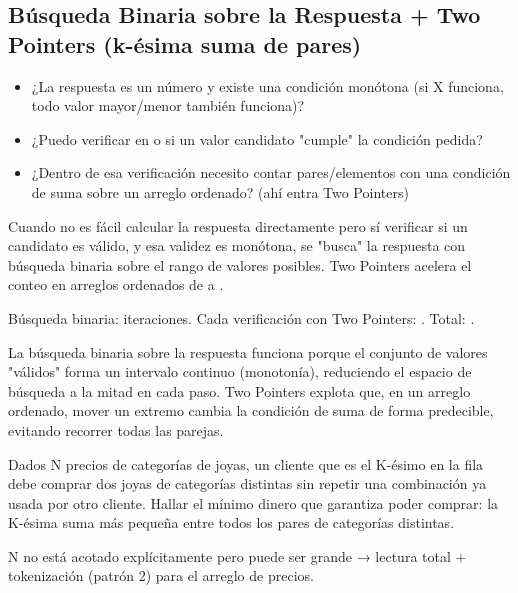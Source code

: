 \subsection{Búsqueda Binaria sobre la Respuesta + Two Pointers (k-ésima suma de pares)}
\label{alg:5-1}


\begin{itemize}
\item ¿La respuesta es un número y existe una condición monótona (si X funciona, todo valor mayor/menor también funciona)?
\item ¿Puedo verificar en  o  si un valor candidato "cumple" la condición pedida?
\item ¿Dentro de esa verificación necesito contar pares/elementos con una condición de suma sobre un arreglo ordenado? (ahí entra Two Pointers)
\end{itemize}

 Cuando no es fácil calcular la respuesta directamente pero sí verificar si un candidato es válido, y esa validez es monótona, se "busca" la respuesta con búsqueda binaria sobre el rango de valores posibles. Two Pointers acelera el conteo en arreglos ordenados de  a .

 Búsqueda binaria:  iteraciones. Cada verificación con Two Pointers: . Total: .

 La búsqueda binaria sobre la respuesta funciona porque el conjunto de valores "válidos" forma un intervalo continuo (monotonía), reduciendo el espacio de búsqueda a la mitad en cada paso. Two Pointers explota que, en un arreglo ordenado, mover un extremo cambia la condición de suma de forma predecible, evitando recorrer todas las parejas.


Dados N precios de categorías de joyas, un cliente que es el K-ésimo en la fila debe comprar dos joyas de categorías distintas sin repetir una combinación ya usada por otro cliente. Hallar el mínimo dinero que garantiza poder comprar: la K-ésima suma más pequeña entre todos los pares de categorías distintas.

 N no está acotado explícitamente pero puede ser grande → lectura total + tokenización (patrón 2) para el arreglo de precios.


